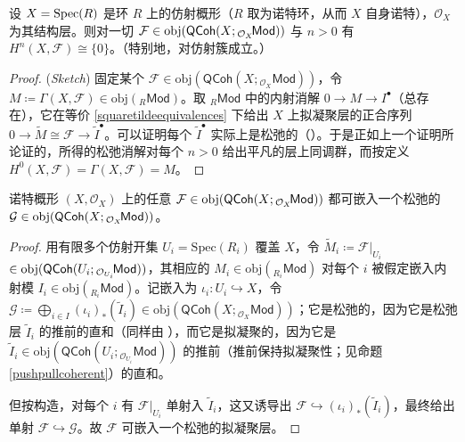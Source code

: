 \begin{Lem}\label{neq0sheafcohomonaffinesch}
设 $X=\textup{Spec}(R)$ 是环 $R$ 上的仿射概形（$R$ 取为诺特环，从而 $X$ 自身诺特），$\mathcal{O}_X$ 为其结构层。则对一切 $\mathcal{F}\in\textup{obj}(\mathsf{QCoh}(X;{}_{\mathcal{O}_X}\!\mathsf{Mod}))$ 与 $n>0$ 有 $H^n(X,\mathcal{F})\cong \{0\}$。（特别地，对仿射簇成立。）
\end{Lem}

\begin{proof}(\textit{Sketch})
固定某个 $\mathcal{F}\in\text{obj}(\mathsf{QCoh}(X;{}_{\mathcal{O}_X}\!\mathsf{Mod}))$，令 $M\coloneqq\Gamma(X,\mathcal{F})\in\text{obj}({}_R\mathsf{Mod})$。取 ${}_R\mathsf{Mod}$ 中的内射消解 $0\rightarrow M\rightarrow I^\bullet$（总存在），它在等价 \eqref{squaretildeequivalences} 下给出 $X$ 上拟凝聚层的正合序列 $0\rightarrow \widetilde{M}\cong\mathcal{F}\rightarrow\widetilde{I}^\bullet$。可以证明每个 $\widetilde{I}^\bullet$ 实际上是松弛的（\cite[Proposition III.3.4]{[Har77]}）。于是正如上一个证明所论证的，所得的松弛消解对每个 $n>0$ 给出平凡的层上同调群，而按定义 $H^0(X,\mathcal{F})=\Gamma(X,\mathcal{F})=M$。 
\end{proof}

\begin{Cor}\label{embedinflasque}
诺特概形 $(X,\mathcal{O}_X)$ 上的任意 $\mathcal{F}\in\textup{obj}(\mathsf{QCoh}(X;{}_{\mathcal{O}_X}\!\mathsf{Mod}))$ 都可嵌入一个松弛的 $\mathcal{G}\in\textup{obj}(\mathsf{QCoh}(X;{}_{\mathcal{O}_X}\!\mathsf{Mod}))$。
\end{Cor}

\begin{proof}
用有限多个仿射开集 $U_i=\text{Spec}(R_i)$ 覆盖 $X$，令 $\widetilde{M}_i\coloneqq\mathcal{F}|_{U_i}$ $\in\textup{obj}(\mathsf{QCoh}(U_i;{}_{\mathcal{O}_{U_i}}\!\mathsf{Mod}))$，其相应的 $M_i\in\text{obj}({}_{R_i}\mathsf{Mod})$ 对每个 $i$ 被假定嵌入内射模 $I_i\in\text{obj}({}_{R_i}\mathsf{Mod})$。记嵌入为 $\iota_i:U_i\hookrightarrow X$，令 $\mathcal{G}\coloneqq\bigoplus_{i\in I}(\iota_i)_*(\widetilde{I}_i)\in\text{obj}(\mathsf{QCoh}(X;{}_{\mathcal{O}_X}\!\mathsf{Mod}))$；它是松弛的，因为它是松弛层 $\widetilde{I}_i$ 的推前的直和（同样由 \cite[Proposition III.3.4]{[Har77]}），而它是拟凝聚的，因为它是 $\widetilde{I}_i\in\text{obj}(\mathsf{QCoh}(U_i;{}_{\mathcal{O}_{U_i}}\!\mathsf{Mod}))$ 的推前（推前保持拟凝聚性；见命题 \ref{pushpullcoherent}）的直和。

但按构造，对每个 $i$ 有 $\mathcal{F}|_{U_i}$ 单射入 $\widetilde{I}_i$，这又诱导出 $\mathcal{F}\hookrightarrow(\iota_i)_*(\widetilde{I}_i)$，最终给出单射 $\mathcal{F}\hookrightarrow\mathcal{G}$。故 $\mathcal{F}$ 可嵌入一个松弛的拟凝聚层。
\end{proof}

